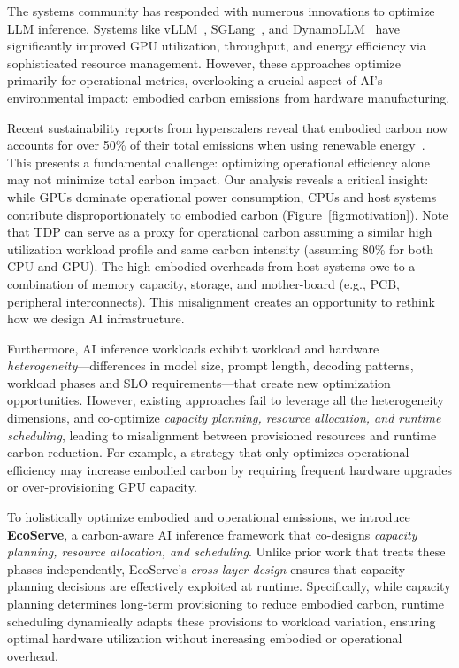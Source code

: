 




The systems community has responded with numerous innovations to optimize LLM inference. Systems like vLLM~\cite{vllm2024perfupdate}, SGLang~\cite{zheng2023efficiently}, and DynamoLLM~\cite{stojkovic2024dynamollm} have significantly improved GPU utilization, throughput, and energy efficiency via sophisticated resource management. However, these approaches optimize primarily for operational metrics, overlooking a crucial aspect of AI's environmental impact: embodied carbon emissions from hardware manufacturing.

Recent sustainability reports from hyperscalers reveal that embodied carbon now accounts for over 50\% of their total emissions when using renewable energy~\cite{gupta2021chasing,microsoftSustainabilityReport,GoogleSustainabilityReport}. This presents a fundamental challenge: optimizing operational efficiency alone may not minimize total carbon impact. Our analysis reveals a critical insight: while GPUs dominate operational power consumption, CPUs and host systems contribute disproportionately to embodied carbon (Figure~\ref{fig:motivation}). Note that TDP can serve as
a proxy for operational carbon assuming a similar high utilization workload profile and same carbon intensity (assuming 80\% for both CPU and GPU).
The high embodied overheads from host systems owe to a combination of memory capacity, storage, and mother-board (e.g., PCB, peripheral interconnects). This misalignment creates an opportunity to rethink how we design AI infrastructure.


 Furthermore, AI inference workloads exhibit workload and hardware \textit{heterogeneity}—differences in model size, prompt length, decoding patterns, workload phases and SLO requirements—that create new optimization opportunities. %
 However, existing approaches fail to leverage all the heterogeneity dimensions, and co-optimize \textit{capacity planning, resource allocation, and runtime scheduling}, leading to misalignment between provisioned resources and runtime carbon reduction. For example, a strategy that only optimizes operational efficiency may increase embodied carbon by requiring frequent hardware upgrades or over-provisioning GPU capacity.

To holistically optimize embodied and operational emissions, we introduce \textbf{EcoServe}, a carbon-aware AI inference framework that co-designs \textit{capacity planning, resource allocation, and scheduling}. Unlike prior work that treats these phases independently, EcoServe’s \textit{cross-layer design} ensures that capacity planning decisions are effectively exploited at runtime. Specifically, while capacity planning determines long-term provisioning to reduce embodied carbon, runtime scheduling dynamically adapts these provisions to workload variation, ensuring optimal hardware utilization without increasing embodied or operational overhead.

